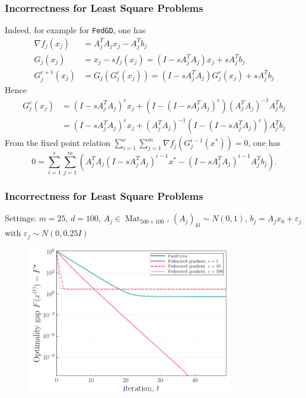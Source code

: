 \begin{frame}
\frametitle{Incorrectness for Least Square Problems}

Indeed, for example for \texttt{FedGD}, one has
\begin{align*}
\nabla f_j(x_j) & = A_j^TA_jx_j - A^T_jb_j \\
G_j(x_j) & = x_j - s f_j(x_j) =  (I - sA_j^TA_j)x_j + sA^T_jb_j \\
G_j^{e+1}(x_j) & = G_j(G_j^e(x_j)) = (I - sA_j^TA_j)G_j^e(x_j) + sA^T_jb_j
\end{align*}
Hence
\begin{align*}
G_j^e(x_j) & = (I - sA_j^TA_j)^e x_j + (I-(I - sA_j^TA_j)^e) (A_j^TA_j)^{-1} A_j^T b_j \\
& = (I - sA_j^TA_j)^e x_j + (A_j^TA_j)^{-1} (I-(I - sA_j^TA_j)^e) A_j^T b_j
\end{align*}
From the fixed point relation {\smaller$\sum\limits_{i=1}^e\sum\limits_{j=1}^m \nabla f_j(G_j^{i-1}(x^*)) = 0$}, one has
$$0 = \sum\limits_{i=1}^e \sum\limits_{j=1}^m \left( A_j^TA_j (I - sA_j^TA_j)^{i-1} x^* - (I - sA_j^TA_j)^{i-1}A_j^Tb_j \right).$$

\end{frame}


\begin{frame}
\frametitle{Incorrectness for Least Square Problems}

Settings: $m=25$, $d=100$, $A_j \in \operatorname{Mat}_{500\times 100}$, $(A_j)_{kl} \sim N(0,1)$, $b_j = A_jx_0 + \varepsilon_j$ with $\varepsilon_j \sim N(0,0.25I)$

\begin{figure}
\centering
\includegraphics[width=0.8\textwidth]{images/fedsplit-gap.png}
\end{figure}

\end{frame}


